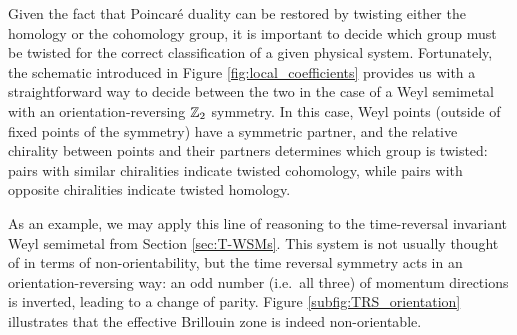 Given the fact that Poincaré duality can be restored by twisting either the homology or the cohomology group, it is important to decide which group must be twisted for the correct classification of a given physical system. Fortunately, the schematic introduced in Figure \ref{fig:local_coefficients} provides us with a straightforward way to decide between the two in the case of a Weyl semimetal with an orientation-reversing $\mathbb{Z}_2$ symmetry. In this case, Weyl points (outside of fixed points of the symmetry) have a symmetric partner, and the relative chirality between points and their partners determines which group is twisted: pairs with similar chiralities indicate twisted cohomology, while pairs with opposite chiralities indicate twisted homology.

As an example, we may apply this line of reasoning to the time-reversal invariant Weyl semimetal from Section \ref{sec:T-WSMs}. This system is not usually thought of in terms of non-orientability, but the time reversal symmetry acts in an orientation-reversing way: an odd number (i.e.\ all three) of momentum directions is inverted, leading to a change of parity. Figure \ref{subfig:TRS_orientation} illustrates that the effective Brillouin zone is indeed non-orientable.
